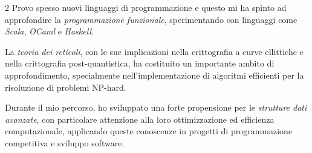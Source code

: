 \documentclass[10pt]{article} %
\begin{document}
\begin{paracol}{2}
    Provo spesso nuovi linguaggi di programmazione e questo mi ha spinto ad approfondire la \textit{programmazione funzionale}, sperimentando con linguaggi come \textit{Scala}, \textit{OCaml} e \textit{Haskell}.

    \medskip
    La \textit{teoria dei reticoli}, con le sue implicazioni nella crittografia a curve ellittiche e nella crittografia post-quantistica, ha costituito un importante ambito di approfondimento, specialmente nell'implementazione di algoritmi efficienti per la risoluzione di problemi NP-hard.

    \medskip
    Durante il mio percorso, ho sviluppato una forte propensione per le \textit{strutture dati avanzate}, con particolare attenzione alla loro ottimizzazione ed efficienza computazionale, applicando queste conoscenze in progetti di programmazione competitiva e sviluppo software.






    \switchcolumn %



\end{paracol}
\end{document}
